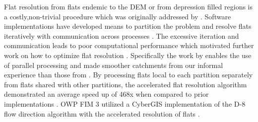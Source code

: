 Flat resolution from flats endemic to the DEM or from depression filled regions is a costly,non-trivial procedure which was originally addressed by .  
Software implementations have developed means to partition the problem and resolve flats iteratively with communication across processes \cite{tarboton2009generalized,tesfa2011extraction,wallis2009parallel,tarboton2005terrain}.
The excessive iteration and communication leads to poor computational performance which motivated further work on how to optimize flat resolution \cite{survila2016scalable,barnes2014efficient}.
Specifically the work by  enables the use of parallel processing and made smoother catchments from our informal experience than those from .
By processing flats local to each partition separately from flats shared with other partitions, the accelerated flat resolution algorithm demonstrated an average speed up of 468x when compared to prior implementations \cite{survila2016scalable}.
OWP FIM 3 utilized a CyberGIS implementation of the D-8 flow direction algorithm with the accelerated resolution of flats \cite{survila2016scalable,cybergis2016}.
%

